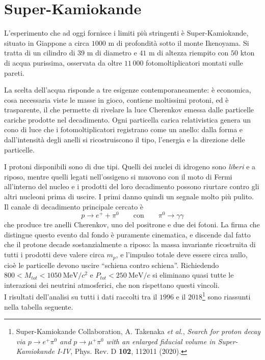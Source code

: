\section{Super-Kamiokande}

L'esperimento che ad oggi fornisce i limiti più stringenti è Super-Kamiokande, situato in Giappone a circa $1000$ m di profondità sotto il monte Ikenoyama. Si tratta di un cilindro di $39$ m di diametro e $41$ m di altezza riempito con $50$ kton di acqua purissima, osservata da oltre $11\,000$ fotomoltiplicatori montati sulle pareti. 

La scelta dell'acqua risponde a tre esigenze contemporaneamente: è economica, cosa necessaria viste le masse in gioco, contiene moltissimi protoni, ed è trasparente, il che permette di rivelare la luce Cherenkov emessa dalle particelle cariche prodotte nel decadimento. Ogni particella carica relativistica genera un cono di luce che i fotomoltiplicatori registrano come un anello: dalla forma e dall'intensità degli anelli si ricostruiscono il tipo, l'energia e la direzione delle particelle. 

I protoni disponibili sono di due tipi. Quelli dei nuclei di idrogeno sono \emph{liberi} e a riposo, mentre quelli legati nell'ossigeno si muovono con il moto di Fermi all'interno del nucleo e i prodotti del loro decadimento possono riurtare contro gli altri nucleoni prima di uscire. I primi danno quindi un segnale molto più pulito.\\

Il canale di decadimento principale cercato è
%
\begin{equation*}
    p \longrightarrow e^+ + \pi^0 \qquad \text{con} \qquad \pi^0 \to \gamma \gamma
\end{equation*}
che produce tre anelli Cherenkov, uno del positrone e due dei fotoni. La firma che distingue questo evento dal fondo è puramente cinematica, e discende dal fatto che il protone decade sostanzialmente a riposo: la massa invariante ricostruita di tutti i prodotti deve valere circa $m_p$, e l'impulso totale deve essere circa nullo, cioè le particelle devono uscire ``schiena contro schiena''. Richiedendo $800 < M_{tot} < 1050 \ \mathrm{MeV}/c^2$ e $P_{tot} < 250 \ \mathrm{MeV}/c$ si eliminano quasi tutte le interazioni dei neutrini atmosferici, che non rispettano questi vincoli.\\

I risultati dell'analisi su tutti i dati raccolti tra il $1996$ e il $2018$\footnote{Super-Kamiokande Collaboration, A. Takenaka \emph{et al.}, \emph{Search for proton decay via $p \to e^+\pi^0$ and $p \to \mu^+\pi^0$ with an enlarged fiducial volume in Super-Kamiokande I-IV}, Phys. Rev. D \textbf{102}, 112011 (2020).} sono riassunti nella tabella seguente. 

